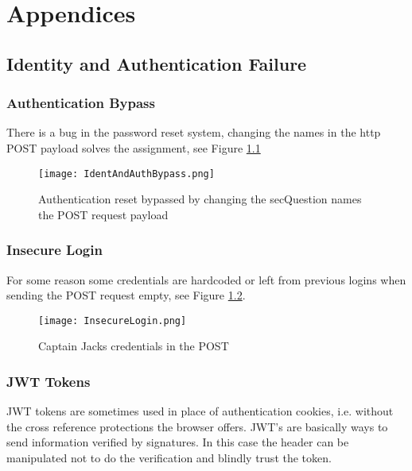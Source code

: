 \documentclass[
	letterpaper, %
	10pt, %
	unnumberedsections, %
	twoside, %
]{APAAssignment}
\begin{document}
\chapter{Appendices}
\begin{appendices}



\section{Identity and Authentication Failure}\label{app:AuthAndFailure}
\subsection{Authentication Bypass}
There is  a bug in the password reset system, changing the names in the http POST payload solves the assignment, see Figure \ref{fig:app:AuthBypass}   

\begin{figure}[!ht] %
	\centering
	\texttt{[image: IdentAndAuthBypass.png]}
	\caption{Authentication reset bypassed by changing the secQuestion names the POST request payload}
	\label{fig:app:AuthBypass}
\end{figure}

\subsection{Insecure Login}
For some reason some credentials are hardcoded or left from previous logins when sending the POST request empty, see Figure \ref{fig:app:InsecureLogin}.

\begin{figure}[!ht] %
	\centering
	\texttt{[image: InsecureLogin.png]}
	\caption{Captain Jacks credentials in the POST}
	\label{fig:app:InsecureLogin}
\end{figure}

\subsection{JWT Tokens}\label{app:jwtTokens}
JWT tokens are sometimes used in place of authentication cookies, i.e. without the cross reference protections the browser offers. JWT's are basically ways to send information verified by signatures. In this case the header can be manipulated not to do the verification and blindly trust the token.


\end{appendices}
\end{document}
